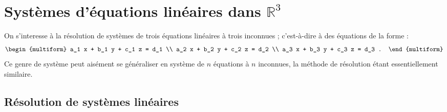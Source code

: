 
\TCDLessonStyleOn
\chapter{Syst\`emes d'\'equations lin\'eaires dans $\mathbb{R}^3$}
On s'interesse \`a la r\'esolution de syst\`emes de trois \'equations lin\'eaires \`a trois inconnues ;
c'est-\`a-dire \`a des \'equations de la forme :
\[
	\begin{multiform}
		a_1 x + b_1 y + c_1 z = d_1	\\
		a_2 x + b_2 y + c_2 z = d_2	\\
		a_3 x + b_3 y + c_3 z = d_3	.
	\end{multiform}
\]
Ce genre de syst\`eme peut ais\'ement se g\'en\'eraliser en syst\`eme de $n$ \'equations \`a $n$ inconnues, 
la m\'ethode de r\'esolution \'etant essentiellement similaire.

                  \section{R\'esolution de syst\`emes lin\'eaires}

